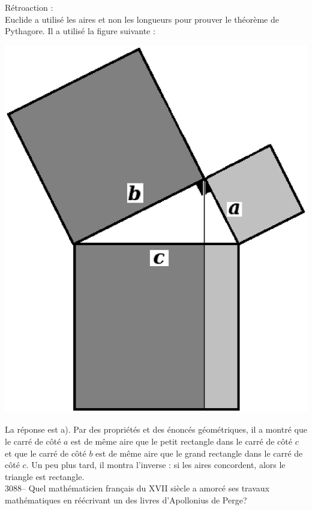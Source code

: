 \documentclass[letterpaper, 12pt]{article}
\begin{document}
R\'etroaction :\\
Euclide a utilis\'e les aires et non les longueurs pour prouver le th\'eor\`eme de Pythagore. Il a utilis\'e la figure suivante :\\
\begin{center}
\includegraphics[scale=0.3]{pyth_euclide2.eps}\\
\end{center}

La r\'eponse est a). Par des propri\'et\'es et des \'enonc\'es g\'eom\'etriques, il a montr\'e que le carr\'e de c\^ot\'e $a$ est de m\^eme aire que le petit rectangle dans le carr\'e de c\^ot\'e $c$ et que le carr\'e de c\^ot\'e $b$ est de m\^eme aire que le grand rectangle dans le carr\'e de c\^ot\'e $c$. Un peu plus tard, il montra l'inverse : si les aires concordent, alors le triangle est rectangle.\\



3088-- Quel math\'ematicien fran\c cais du {\scriptsize XVII\ieme{}} si\`ecle a amorc\'e ses travaux math\'ematiques en r\'e\'ecrivant un des livres d'Apollonius de Perge?\\
\end{document}
